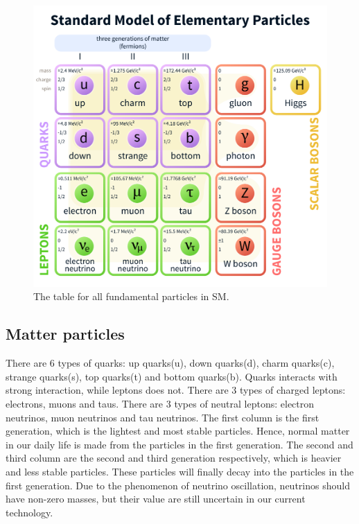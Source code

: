 \begin{figure}
\centering
\includegraphics[width=\textwidth]{data/photo/theory/SM_particles.png}
\caption{The table for all fundamental particles in SM. \cite{SM_particles}}
\label{fig:SM_particles}
\end{figure}

\subsection{Matter particles}
There are 6 types of quarks: up quarks(u), down quarks(d), charm quarks(c), strange quarks(s), top quarks(t) and bottom quarks(b).
Quarks interacts with strong interaction, while leptons does not.
There are 3 types of charged leptons: electrons, muons and taus.
There are 3 types of neutral leptons: electron neutrinos, muon neutrinos and tau neutrinos.
The first column is the first generation, which is the lightest and most stable particles.
Hence, normal matter in our daily life is made from the particles in the first generation.
The second and third column are the second and third generation respectively, which is heavier and less stable particles.
These particles will finally decay into the particles in the first generation.
Due to the phenomenon of neutrino oscillation, neutrinos should have non-zero masses, but their value are still uncertain in our current technology.

